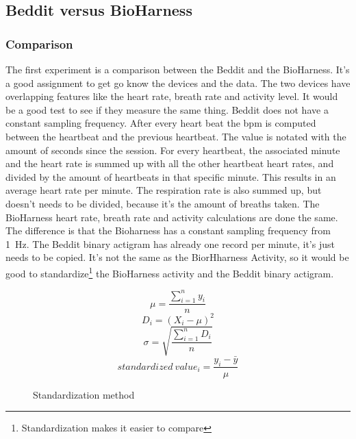 	\subsection{Beddit versus BioHarness}
		\subsubsection{Comparison}
			The first experiment is a comparison between the Beddit and the BioHarness. It's a good assignment to get go know the devices and the data. The two devices have overlapping features like the heart rate, breath rate and activity level. It would be a good test to see if they measure the same thing. 
			Beddit does not have a constant sampling frequency. After every heart beat the bpm is computed between the heartbeat and the previous heartbeat. The value is notated with the amount of seconds since the session. For every heartbeat, the associated minute and the heart rate is summed up with all the other heartbeat heart rates, and divided by the amount of heartbeats in that specific minute. This results in an average heart rate per minute. The respiration rate is also summed up, but doesn't needs to be divided, because it's the amount of breaths taken.
			The BioHarness heart rate, breath rate and activity calculations are done the same. The difference is that the Bioharness has a constant sampling frequency from \SI{1}{\hertz}. 
			The Beddit binary actigram has already one record per minute, it's just needs to be copied. It's not the same as the BiorHharness Activity, so it would be good to standardize\footnote{Standardization makes it easier to compare} the BioHarness activity and the Beddit binary actigram.
			\begin{figure}[h]
				\begin{equation}
					\label{eq:standardize}
					\mu = \frac{ \sum\limits_{i=1}^n y_i } { n }
				\end{equation}
				\begin{equation}
					D_i = (X_i - \mu)^2
				\end{equation}
				\begin{equation}
					\sigma = \sqrt{ \frac{ \sum\limits_{i=1}^n D_i } { n } }
				\end{equation}
				\begin{equation}
					standardized\ value_i = \frac{ y_i - \bar{y} } { \mu }
				\end{equation}
				\caption{Standardization method\cite{statistics}}
			\end{figure}


